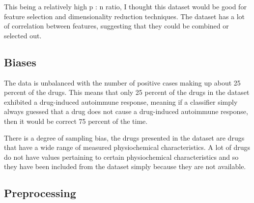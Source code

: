 \documentclass{article}
\begin{document}
This being a relatively high p : n ratio, I thought this dataset would be good for feature selection and dimensionality reduction techniques. The dataset has a lot of correlation between features, suggesting that they could be combined or selected out. 


\subsection{Biases}

The data is unbalanced with the number of positive cases making up about 25 percent of the drugs. This means that only 25 percent of the drugs in the dataset exhibited a drug-induced autoimmune response, meaning if a classifier simply always guessed that a drug does not cause a drug-induced autoimmune response, then it would be correct 75 percent of the time. 

There is a degree of sampling bias, the drugs presented in the dataset are drugs that have a wide range of measured physiochemical characteristics. A lot of drugs do not have values pertaining to certain physiochemical characteristics and so they have been included from the dataset simply because they are not available. 

\subsection{Preprocessing}
\end{document}
